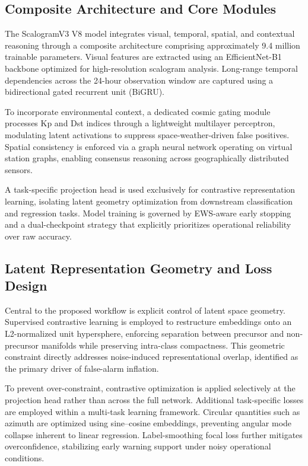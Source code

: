 \documentclass[a4paper,fleqn]{cas-sc}
\begin{document}
\subsection{Composite Architecture and Core Modules}

The ScalogramV3 V8 model integrates visual, temporal, spatial, and contextual reasoning through a composite architecture comprising approximately 9.4 million trainable parameters. Visual features are extracted using an EfficientNet-B1 backbone optimized for high-resolution scalogram analysis. Long-range temporal dependencies across the 24-hour observation window are captured using a bidirectional gated recurrent unit (BiGRU).

To incorporate environmental context, a dedicated cosmic gating module processes Kp and Dst indices through a lightweight multilayer perceptron, modulating latent activations to suppress space-weather-driven false positives. Spatial consistency is enforced via a graph neural network operating on virtual station graphs, enabling consensus reasoning across geographically distributed sensors.

A task-specific projection head is used exclusively for contrastive representation learning, isolating latent geometry optimization from downstream classification and regression tasks. Model training is governed by EWS-aware early stopping and a dual-checkpoint strategy that explicitly prioritizes operational reliability over raw accuracy.

\subsection{Latent Representation Geometry and Loss Design}

Central to the proposed workflow is explicit control of latent space geometry. Supervised contrastive learning is employed to restructure embeddings onto an L2-normalized unit hypersphere, enforcing separation between precursor and non-precursor manifolds while preserving intra-class compactness. This geometric constraint directly addresses noise-induced representational overlap, identified as the primary driver of false-alarm inflation.

To prevent over-constraint, contrastive optimization is applied selectively at the projection head rather than across the full network. Additional task-specific losses are employed within a multi-task learning framework. Circular quantities such as azimuth are optimized using sine–cosine embeddings, preventing angular mode collapse inherent to linear regression. Label-smoothing focal loss further mitigates overconfidence, stabilizing early warning support under noisy operational conditions.
\end{document}
